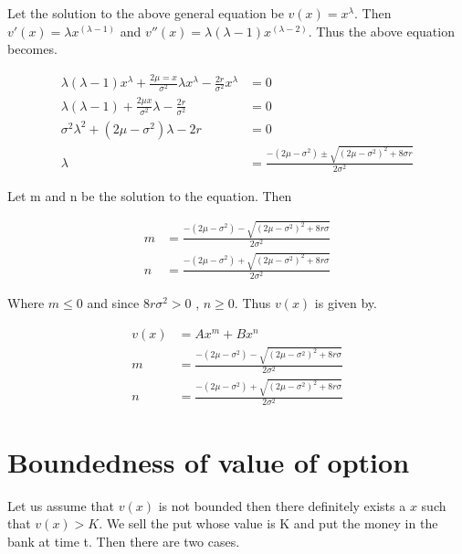 \documentclass[12pt]{report}
\begin{document}
Let the solution to the above general equation be $v(x) = x^\lambda$. Then $v'(x) = \lambda x^{(\lambda-1)}$ and $v''(x) = \lambda (\lambda-1) x^{(\lambda-2)}$. Thus the above equation becomes.

\begin{equation*}
	\begin{aligned}
		\lambda (\lambda-1) x^\lambda + \frac{2\mu =x}{\sigma^2} \lambda x^\lambda - \frac{2r}{\sigma^2} x^\lambda &= 0\\
		\lambda (\lambda -1) + \frac{2\mu x}{\sigma^2} \lambda - \frac{2r}{\sigma^2} & =0 \\
		\sigma^2 \lambda^2 + {(2\mu - \sigma^2)}\lambda - {2r} &=0 \\
		\lambda &= \frac{-(2\mu - \sigma^2) \pm \sqrt{(2\mu - \sigma^2)^2 + 8\sigma r} }{2\sigma^2} 	
	\end{aligned}
\end{equation*}

Let m and n be the solution to the equation. Then

\begin{equation*}
	\begin{aligned}
		m & = \frac{-(2\mu - \sigma^2) - \sqrt{(2\mu - \sigma^2)^2 + 8r\sigma} }{2\sigma^2} \\
		n &= \frac{-(2\mu - \sigma^2) + \sqrt{(2\mu - \sigma^2)^2 + 8r\sigma} }{2\sigma^2}  
	\end{aligned}
\end{equation*}

Where $m\leq0$ and since $8r\sigma^2 >0$ , $n\geq0$. Thus $v(x)$ is given by.

\begin{equation*}
\begin{aligned}
	v(x) &= Ax^m + Bx^n\\
	m & = \frac{-(2\mu - \sigma^2) - \sqrt{(2\mu - \sigma^2)^2 + 8r\sigma} }{2\sigma^2} \\
	n &= \frac{-(2\mu - \sigma^2) + \sqrt{(2\mu - \sigma^2)^2 + 8r\sigma} }{2\sigma^2}  
\end{aligned}	
\end{equation*}

\section*{Boundedness of value of option}

Let us assume that $v(x)$ is not bounded then there definitely exists a $x$ such that $v(x) > K$. We sell the put whose value is K and put the money in the bank at time t. Then there are two cases.
\end{document}
